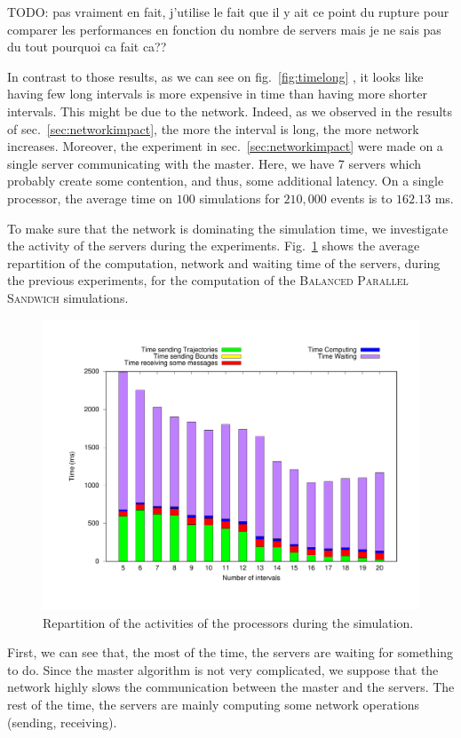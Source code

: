 \documentclass[a4paper,10pt]{article}
\newcommand{\todo}[1]{{\color{red} TODO: {#1}}}
\begin{document}
\todo{pas vraiment en fait, j'utilise le fait que il y ait ce point du rupture pour comparer les performances en fonction du nombre de servers mais je ne sais pas du tout pourquoi ca fait ca??}

In contrast to those results, as we can see on fig.~\ref{fig:timelong} , it looks like having few long intervals is more expensive in time than having more shorter intervals. This might be due to the network. Indeed, as we observed in the results of sec.~\ref{sec:networkimpact}, the more the interval is long, the more network increases. Moreover, the experiment in sec.~\ref{sec:networkimpact} were made on a single server communicating with the master. Here, we have 7 servers which probably create some contention, and thus, some additional latency.
On a single processor, the average time on $100$ simulations for $210,000$ events is to $162.13$ ms.

To make sure that the network is dominating the simulation time, we investigate the activity of the servers during the experiments. Fig.~\ref{fig:servers} shows the average repartition of the computation, network and waiting time of the servers, during the previous experiments, for the computation of the \textsc{Balanced Parallel Sandwich} simulations.


\begin{figure}[H]
\centering
\label{fig:servers}
 \includegraphics[scale=0.45]{server.pdf}
 \caption{Repartition of the activities of the processors during the simulation.}
\end{figure}

First, we can see that, the most of the time, the servers are waiting for something to do. Since the master algorithm is not very complicated, we suppose that the network highly slows the communication between the master and the servers. The rest of the time, the servers are mainly computing some network operations (sending, receiving).
\end{document}
